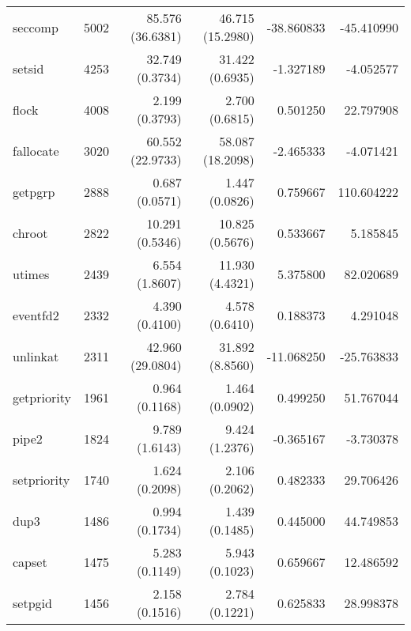\begin{longtable}{>{\ttfamily}lrrrrr}
                        seccomp &       5002 &         85.576 (36.6381) &         46.715 (15.2980) &      -38.860833 &   -45.410990 \\
                         setsid &       4253 &          32.749 (0.3734) &          31.422 (0.6935) &       -1.327189 &    -4.052577 \\
                          flock &       4008 &           2.199 (0.3793) &           2.700 (0.6815) &        0.501250 &    22.797908 \\
                      fallocate &       3020 &         60.552 (22.9733) &         58.087 (18.2098) &       -2.465333 &    -4.071421 \\
                        getpgrp &       2888 &           0.687 (0.0571) &           1.447 (0.0826) &        0.759667 &   110.604222 \\
                         chroot &       2822 &          10.291 (0.5346) &          10.825 (0.5676) &        0.533667 &     5.185845 \\
                         utimes &       2439 &           6.554 (1.8607) &          11.930 (4.4321) &        5.375800 &    82.020689 \\
                       eventfd2 &       2332 &           4.390 (0.4100) &           4.578 (0.6410) &        0.188373 &     4.291048 \\
                       unlinkat &       2311 &         42.960 (29.0804) &          31.892 (8.8560) &      -11.068250 &   -25.763833 \\
                    getpriority &       1961 &           0.964 (0.1168) &           1.464 (0.0902) &        0.499250 &    51.767044 \\
                          pipe2 &       1824 &           9.789 (1.6143) &           9.424 (1.2376) &       -0.365167 &    -3.730378 \\
                    setpriority &       1740 &           1.624 (0.2098) &           2.106 (0.2062) &        0.482333 &    29.706426 \\
                           dup3 &       1486 &           0.994 (0.1734) &           1.439 (0.1485) &        0.445000 &    44.749853 \\
                         capset &       1475 &           5.283 (0.1149) &           5.943 (0.1023) &        0.659667 &    12.486592 \\
                        setpgid &       1456 &           2.158 (0.1516) &           2.784 (0.1221) &        0.625833 &    28.998378 \\

\end{longtable}
